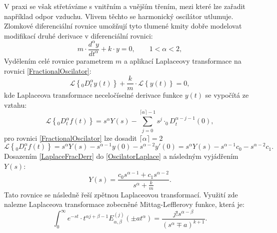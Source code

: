 \documentclass[a4paper,12pt,twoside]{article}
\theoremstyle{definition}
\theoremstyle{remark}
\numberwithin{equation}{section}
\numberwithin{table}{section}
\numberwithin{figure}{section}
\begin{document}
V praxi se však střetáváme s vnitřním a vnějším třením, mezi které lze zařadit například odpor vzduchu. Vlivem těchto se harmonický oscilátor utlumuje. Zlomkové diferenciální rovnice umožňují tyto tlumené kmity dobře modelovat modifikací druhé derivace v diferenciální rovnici:
\begin{equation} \label{FractionalOscilator}
	m \cdot \frac{d^{\alpha} y}{d t^{\alpha}} + k \cdot y = 0, \qquad	1 < \alpha <2,
\end{equation}
Vydělením celé rovnice parametrem $m$ a aplikací Laplaceovy transformace na rovnici \eqref{FractionalOscilator}:
\begin{equation} \label{OscilatorLaplace}
	\mathcal{L} \left\lbrace_{0}D^{\alpha}_{t} y\left(t\right)\right\rbrace + \frac{k}{m} \cdot \mathcal{L} \left\lbrace y\left(t\right) \right\rbrace   = 0,
\end{equation}
kde Laplaceova transformace neceločíselné derivace funkce $y\left(t\right)$ se vypočítá ze vztahu:
\begin{equation} \label{LaplaceFracDerr}
	\mathcal{L} \left\lbrace_{0}D^{\alpha}_{t} f\left(t\right)\right\rbrace = s^{\alpha} Y\left(s\right)  - \sum_{j=0}^{\lceil\alpha\rceil-1} s^{j}\cdot _{0}D^{\alpha-j-1}_{t} \left(0\right),
\end{equation}
pro rovnici \eqref{FractionalOscilator} lze dosadit $\lceil \alpha \rceil = 2$
\begin{equation}
	\mathcal{L} \left\lbrace_{0}D^{\alpha}_{t} f\left(t\right)\right\rbrace = s^{\alpha} Y\left(s\right)  - 
	s^{\alpha - 1} y\left(0\right) -s^{\alpha - 2} y'\left(0\right) = s^{\alpha} Y\left(s\right)  - 
	s^{\alpha - 1} c_{0} -s^{\alpha - 2} c_{1}.
\end{equation}
Dosazením \eqref{LaplaceFracDerr} do \eqref{OscilatorLaplace} a následným vyjádřením $Y\left(s\right)$:
\begin{equation}\label{LaplaceRovniceHarmonickéhoOscilátoru}
	Y\left(s\right) = \frac{c_0 s^{\alpha-1} + c_{1} s^{\alpha - 2}}{s^{\alpha} + \frac{k}{m}}.
\end{equation}
Tato rovnice se následně řeší zpětnou Laplaceovou transformací. Využití zde nalezne Laplaceova transformace zobecněné Mittag-Lefflerovy funkce, která je:
\begin{equation} \label{LaplaceMittag-Leffler}
	\int_{0}^{\infty} e^{-st} \cdot t^{\alpha j +\beta -1} E_{\alpha,\beta}^{\left(j\right)} \left(\pm a t^{\alpha}\right) =\frac{j! s^{\alpha-\beta}}{\left(s^{\alpha} \mp a\right)^{k+1}}.
\end{equation}
\end{document}
